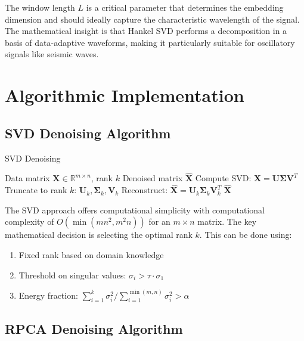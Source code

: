 \documentclass[11pt]{article}
\begin{document}
The window length $L$ is a critical parameter that determines the embedding dimension and should ideally capture the characteristic wavelength of the signal. The mathematical insight is that Hankel SVD performs a decomposition in a basis of data-adaptive waveforms, making it particularly suitable for oscillatory signals like seismic waves.

\section{Algorithmic Implementation}
\subsection{SVD Denoising Algorithm}

\begin{algorithm}
\caption{SVD Denoising}
\begin{algorithmic}[1]
\REQUIRE Data matrix $\mathbf{X} \in \mathbb{R}^{m \times n}$, rank $k$
\ENSURE Denoised matrix $\mathbf{\hat{X}}$
\STATE Compute SVD: $\mathbf{X} = \mathbf{U} \mathbf{\Sigma} \mathbf{V}^T$
\STATE Truncate to rank $k$: $\mathbf{U}_k, \mathbf{\Sigma}_k, \mathbf{V}_k$
\STATE Reconstruct: $\mathbf{\hat{X}} = \mathbf{U}_k \mathbf{\Sigma}_k \mathbf{V}_k^T$
\RETURN $\mathbf{\hat{X}}$
\end{algorithmic}
\end{algorithm}

The SVD approach offers computational simplicity with computational complexity of $O(\min(mn^2, m^2n))$ for an $m \times n$ matrix. The key mathematical decision is selecting the optimal rank $k$. This can be done using:

\begin{enumerate}
\item Fixed rank based on domain knowledge
\item Threshold on singular values: $\sigma_i > \tau \cdot \sigma_1$
\item Energy fraction: $\sum_{i=1}^{k} \sigma_i^2 / \sum_{i=1}^{\min(m,n)} \sigma_i^2 > \alpha$
\end{enumerate}

\subsection{RPCA Denoising Algorithm}
\end{document}
